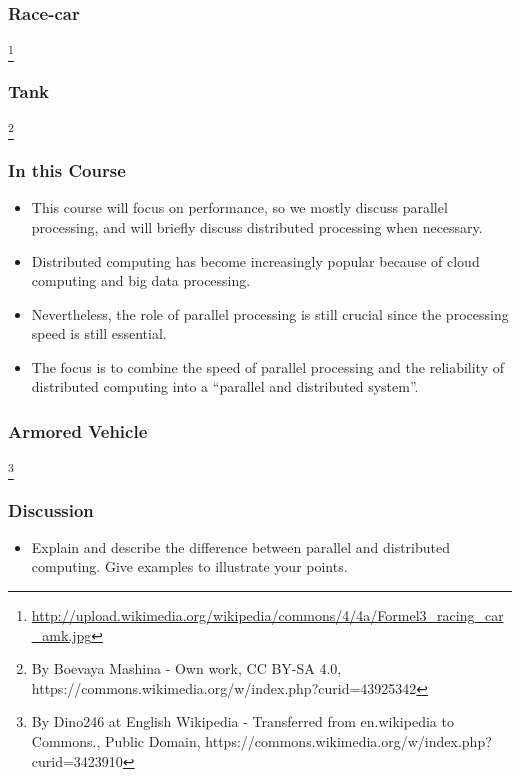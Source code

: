 \documentclass{beamer}
\begin{document}
\begin{CJK}{UTF8}{bsmi}
  \begin{frame}
    \frametitle{Race-car}
    \centerline{}
    \footnote{\url{http://upload.wikimedia.org/wikipedia/commons/4/4a/Formel3_racing_car_amk.jpg}}
  \end{frame}

  \begin{frame}
    \frametitle{Tank}
    \centerline{}
    \footnote{
      By Boevaya Mashina - Own work, CC BY-SA 4.0, https://commons.wikimedia.org/w/index.php?curid=43925342
    }
  \end{frame}

  \begin{frame}
    \frametitle{In this Course}
    \begin{itemize}
    \item This course will focus on performance, so we mostly discuss
      parallel processing, and will briefly discuss distributed processing
      when necessary.
    \item Distributed computing has become increasingly popular because of
      cloud computing and big data processing.
    \item Nevertheless, the role of parallel processing is still crucial
      since the processing speed is still essential.
    \item The focus is to combine the speed of parallel processing and the
      reliability of distributed computing into a ``parallel and
      distributed system''.
    \end{itemize}
  \end{frame}

  \begin{frame}
    \frametitle{Armored Vehicle}
    \centerline{}
    \footnote{By Dino246 at English Wikipedia - Transferred from en.wikipedia to Commons., Public Domain, https://commons.wikimedia.org/w/index.php?curid=3423910}
  \end{frame}

  \begin{frame}
    \frametitle{Discussion} 
    \begin{itemize}
    \item Explain and describe the difference between parallel and
      distributed computing.  Give examples to illustrate your points.
    \end{itemize}
  \end{frame}


\end{CJK}
\end{document}
